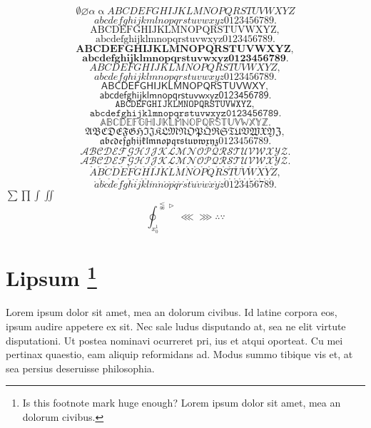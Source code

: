 \documentclass[twoside, 12pt, dvipdfmx]{article}
\begin{document}
        \[
            \emptyset \varnothing \alpha \upalpha%
            ABCDEFGHIJKLMNOPQRSTUVWXYZ
        \]
        \[
            abcdefghijkmlnopqrstuvwxyz0123456789
        .\]
        \[
            \mathrm{ABCDEFGHIJKLMNOPQRSTUVWXYZ}
        ,\]
        \[
            \mathrm{abcdefghijklmnopqrstuvwxyz0123456789}
        .\]
        \[
            \mathbf{ABCDEFGHIJKLMNOPQRSTUVWXYZ}
        ,\]
        \[
            \mathbf{abcdefghijklmnopqrstuvwxyz0123456789}
        .\]
        \[
            \mathit{ABCDEFGHIJKLMNOPQRSTUVWXYZ}
        ,\]
        \[
            \mathit{abcdefghijklmnopqrstuvwxyz0123456789}
        .\]
        \[
            \mathsf{ABCDEFGHIJKLMNOPQRSTUVWXY}
        ,\]
        \[
            \mathsf{abcdefghijklmnopqrstuvwxyz0123456789}
        .\]
        \[
            \mathtt{ABCDEFGHIJKLMNOPQRSTUVWXYZ}
        ,\]
        \[
            \mathtt{abcdefghijklmnopqrstuvwxyz0123456789}
        .\]
        \[
            \mathbb{ABCDEFGHIJKLMNOPQRSTUVWXYZ}
        .\]
        \[
            \mathfrak{ABCDEFGHIJKLMNOPQRSTUVWXYZ}
        ,\]
        \[
            \mathfrak{abcdefghijklmnopqrstuvwxyz0123456789}
        .\]
        \[
            \mathcal{ABCDEFGHIJKLMNOPQRSTUVWXYZ}
        .\]
        \[
            \mathscr{ABCDEFGHIJKLMNOPQRSTUVWXYZ}
        .\]
        \[
            \mathring{A}\mathring{B}\mathring{C}\mathring{D}\mathring{E}\mathring{F}\mathring{G}\mathring{H}\mathring{I}
            \mathring{J}\mathring{K}\mathring{L}\mathring{M}\mathring{N}\mathring{O}\mathring{P}\mathring{Q}\mathring{R}
            \mathring{S}\mathring{T}\mathring{U}\mathring{V}\mathring{W}\mathring{X}\mathring{Y}\mathring{Z}
        ,\]
        \[
            \mathring{a}\mathring{b}\mathring{c}\mathring{d}\mathring{e}\mathring{f}\mathring{g}\mathring{h}\mathring{i}
            \mathring{j}\mathring{k}\mathring{l}\mathring{m}\mathring{n}\mathring{o}\mathring{p}\mathring{q}\mathring{r}
            \mathring{s}\mathring{t}\mathring{u}\mathring{v}\mathring{w}\mathring{x}\mathring{y}\mathring{z}\mathring{0}
            \mathring{1}\mathring{2}\mathring{3}\mathring{4}\mathring{5}\mathring{6}\mathring{7}\mathring{8}\mathring{9}
        .\]
        \(\sum \prod \int \iint \)
        \[\oint_{x_0^1}^{\lnapprox \vartriangleright}\lll \ggg \therefore \because  \]

    \section[Lipsum]{Lipsum
        \footnote[99]{Is this footnote mark huge enough? Lorem ipsum dolor sit amet, mea an dolorum civibus.}{}}
    \label{sec4}
    Lorem ipsum dolor sit amet, mea an dolorum civibus. Id latine corpora eos, ipsum audire appetere ex sit. 
    Nec sale ludus disputando at, sea ne elit virtute disputationi. Ut postea nominavi ocurreret pri, ius et atqui oporteat. 
    Cu mei pertinax quaestio, eam aliquip reformidans ad. Modus summo tibique vis et, at sea persius deseruisse philosophia.
\end{document}
